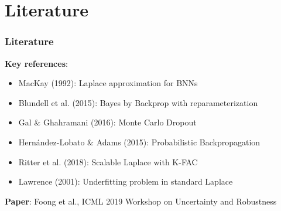 \documentclass[aspectratio=169, 12pt]{beamer}
\begin{document}
\section{Literature}
\begin{frame}
\frametitle{Literature}
\textbf{Key references}:
\begin{itemize}
\item MacKay (1992): Laplace approximation for BNNs
\item Blundell et al. (2015): Bayes by Backprop with reparameterization
\item Gal & Ghahramani (2016): Monte Carlo Dropout
\item Hernández-Lobato & Adams (2015): Probabilistic Backpropagation
\item Ritter et al. (2018): Scalable Laplace with K-FAC
\item Lawrence (2001): Underfitting problem in standard Laplace
\end{itemize}

\vspace{0.3cm}
\textbf{Paper}: Foong et al., ICML 2019 Workshop on Uncertainty and Robustness
\end{frame}
\end{document}
